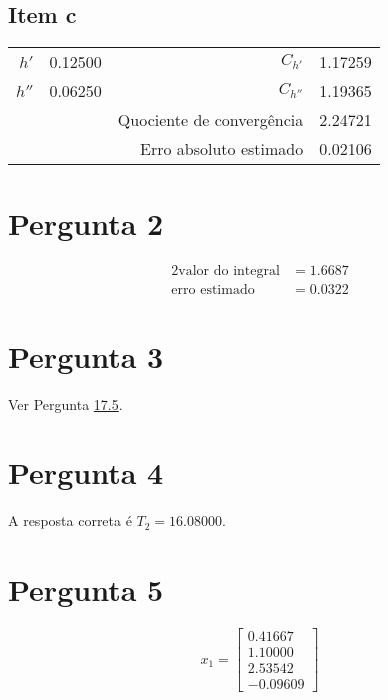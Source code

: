 {\subsection{Item c}
\begin{center} \begin{tabular}{ r | c || r | c}
	$h' $ & 0.12500 & $C_{h'} $ & 1.17259 \\
	$h''$ & 0.06250 & $C_{h''}$ & 1.19365 \\
	      &         & Quociente de convergência & 2.24721 \\
	      &         & Erro absoluto estimado & 0.02106
\end{tabular} \end{center}
\section{Pergunta 2}
%
\begin{alignat*}{2}
	\text{valor do integral} &= 1.6687\\
	\text{erro estimado}     &= 0.0322
\end{alignat*}
\section{Pergunta 3}
Ver Pergunta \hyperref[ssec:17_5]{17.5}.
\section{Pergunta 4}
%
A resposta correta é $T_2=16.08000$.

\section{Pergunta 5}
%
\begin{equation*}
	x_1 = \begin{bmatrix}
		0.41667\\
		1.10000\\
		2.53542\\
		-0.09609
	\end{bmatrix}
\end{equation*}
}